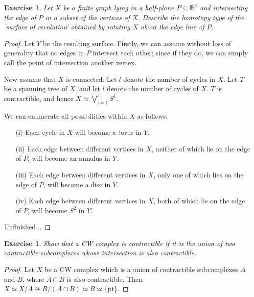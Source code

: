 \documentclass{article}
\newtheorem{exercise}[theorem]{Exercise}
\begin{document}
\begin{exercise}
Let $X$ be a finite graph lying in a half-plane $P\subseteq \mathbb{R}^3$ and intersecting the edge of $P$ in a subset of the vertices of $X$. Describe the homotopy type of the 'surface of revolution' obtained by rotating $X$ about the edge line of $P$.
\end{exercise}
\begin{proof}
Let $Y$ be the resulting surface. Firstly, we can assume without loss of generality that no edges in $P$ intersect each other; since if they do, we can simply call the point of intersection another vertex.

Now assume that $X$ is connected. Let $l$ denote the number of cycles in $X$. Let $T$ be a spanning tree of $X$, and let $l$ denote the number of cycles of $X$. $T$ is contractible, and hence $X\simeq \bigvee_{i=1}^l S^1$.

We can enumerate all possibilities within $X$ as follows:
\begin{enumerate}
\item[(i)] Each cycle in $X$ will become a torus in $Y$.
\item[(ii)] Each edge between different vertices in $X$, neither of which lie on the edge of $P$, will become an annulus in $Y$.
\item[(iii)] Each edge between different vertices in $X$, only one of which lies on the edge of $P$, will become a disc in $Y$.
\item[(iv)] Each edge between different vertices in $X$, both of which lie on the edge of $P$, will become $S^2$ in $Y$.
\end{enumerate}

Unfinished...
\end{proof}

\begin{exercise}
Show that a CW complex is contractible if it is the union of two contractible subcomplexes whose intersection is also contractible.
\end{exercise}
\begin{proof}
Let $X$ be a CW complex which is a union of contractible subcomplexes $A$ and $B$, where $A\cap B$ is also contractible. Then $X\simeq X/A\cong B/(A\cap B)\simeq B\simeq\{\text{pt}\}$.
\end{proof}
\end{document}
